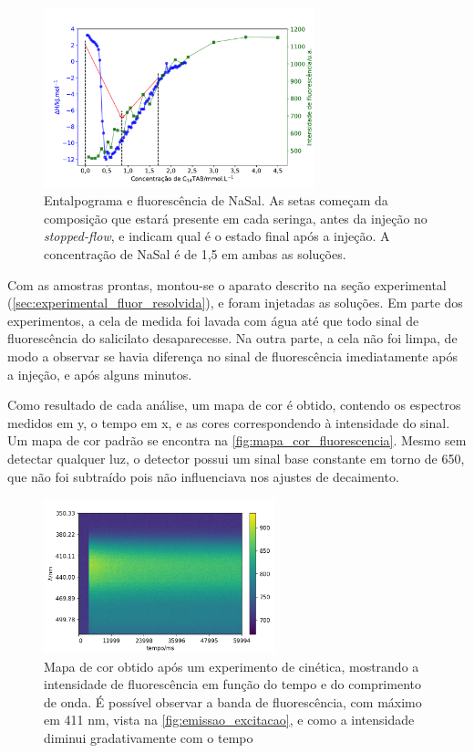 	\begin{figure}[h]
		\centering
		\includegraphics[width=0.7\textwidth]{imagens/fluor/itc_experimento_cinetica}
		\caption{Entalpograma e fluorescência de NaSal. As setas começam da composição que estará presente em cada seringa, antes da injeção no \emph{stopped-flow}, e indicam qual é o estado final após a injeção. A concentração de NaSal é de 1,5 \mM{} em ambas as soluções.}
		\label{fig:itc_experimento_cinetica}
	\end{figure}
	
	Com as amostras prontas, montou-se o aparato descrito na seção experimental (\autoref{sec:experimental_fluor_resolvida}), e foram injetadas as soluções. Em parte dos experimentos, a cela de medida foi lavada com água até que todo sinal de fluorescência do salicilato desaparecesse. Na outra parte, a cela não foi limpa, de modo a observar se havia diferença no sinal de fluorescência imediatamente após a injeção, e após alguns minutos.
	
	Como resultado de cada análise, um mapa de cor é obtido, contendo os espectros medidos em y, o tempo em x, e as cores correspondendo à intensidade do sinal. Um mapa de cor padrão se encontra na \autoref{fig:mapa_cor_fluorescencia}. Mesmo sem detectar qualquer luz, o detector possui um sinal base constante em torno de 650, que não foi subtraído pois não influenciava nos ajustes de decaimento.
	
	\begin{figure}[h]
		\centering
		\includegraphics[width=0.6\textwidth]{imagens/fluor/mapa_cor_am49}
		\caption{Mapa de cor obtido após um experimento de cinética, mostrando a intensidade de fluorescência em função do tempo e do comprimento de onda. É possível observar a banda de fluorescência, com máximo em 411 nm, vista na \autoref{fig:emissao_excitacao}, e como a intensidade diminui gradativamente com o tempo}
		\label{fig:mapa_cor_fluorescencia}
	\end{figure}
	
